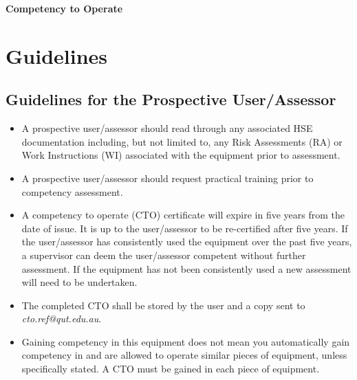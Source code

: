 \documentclass[11pt, a4paper, titlepage]{article}
\begin{document}
    \noindent
    \huge{\textbf{Competency to Operate}} \\
    \huge{\textbf{\Title}}

    \normalsize
    \section{Guidelines}
    \subsection{Guidelines for the Prospective User/Assessor}
    \begin{itemize}[noitemsep]
        \item A prospective user/assessor should read through any associated HSE documentation including, but not limited to, any Risk Assessments (RA) or Work Instructions (WI) associated with the equipment prior to assessment.
        \item A prospective user/assessor should request practical training prior to competency assessment.
        \item A competency to operate (CTO) certificate will expire in five years from the date of issue. It is up to the user/assessor to be re-certified after five years. If the user/assessor has consistently used the equipment over the past five years, a supervisor can deem the user/assessor competent without further assessment. If the equipment has not been consistently used a new assessment will need to be undertaken.
        \item The completed CTO shall be stored by the user and a copy sent to \textit{cto.ref@qut.edu.au}.
        \item Gaining competency in this equipment does not mean you automatically gain competency in and are allowed to operate similar pieces of equipment, unless specifically stated. A CTO must be gained in each piece of equipment.
    \end{itemize}
\end{document}
